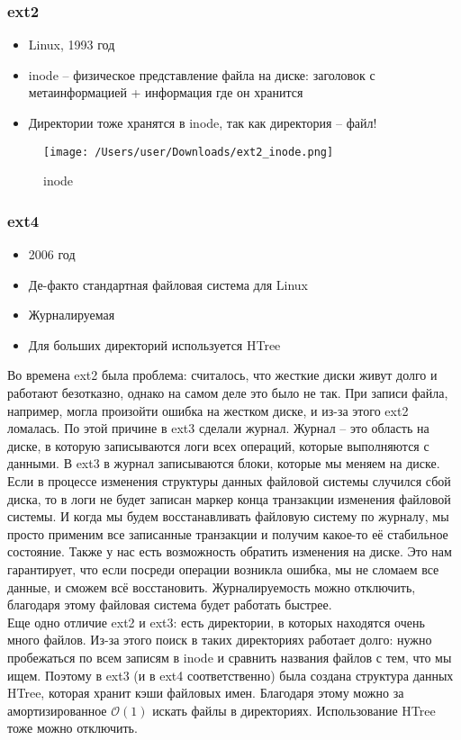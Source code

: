   \subsubsection{ext2}
    \begin{itemize}
      \item Linux, 1993 год
      \item inode -- физическое представление файла на диске: заголовок с метаинформацией + информация где он хранится
      \item Директории тоже хранятся в inode, так как директория -- файл!
    \end{itemize}

\begin{figure}[h!]
  \texttt{[image: /Users/user/Downloads/ext2\_inode.png]}
  \caption{inode}
  \label{fig:inode}
\end{figure}  
  
  \subsubsection{ext4}
    \begin{itemize}
      \item 2006 год
      \item Де-факто стандартная файловая система для Linux
      \item Журналируемая
      \item Для больших директорий используется HTree
    \end{itemize}
  
    Во времена ext2 была проблема: считалось, что жесткие диски живут долго и работают безотказно, однако на самом деле это было не так. При записи файла, например, могла произойти ошибка на жестком диске, и из-за этого ext2 ломалась. По этой причине в ext3 сделали журнал. Журнал -- это область на диске, в которую записываются логи всех операций, которые выполняются с данными. В ext3 в журнал записываются блоки, которые мы меняем на диске. Если в процессе изменения структуры данных файловой системы случился сбой диска, то в логи не будет записан маркер конца транзакции изменения файловой системы. И когда мы будем восстанавливать файловую систему по журналу, мы просто применим все записанные транзакции и получим какое-то её стабильное состояние. Также у нас есть возможность обратить изменения на диске. Это нам гарантирует, что если посреди операции возникла ошибка, мы не сломаем все данные, и сможем всё восстановить. Журналируемость можно отключить, благодаря этому файловая система будет работать быстрее. \\
    Еще одно отличие ext2 и ext3: есть директории, в которых находятся очень много файлов. Из-за этого поиск в таких директориях работает долго: нужно пробежаться по всем записям в inode и сравнить названия файлов с тем, что мы ищем. Поэтому в ext3 (и в ext4 соответственно) была создана структура данных HTree, которая хранит кэши файловых имен. Благодаря этому можно за амортизированное $\mathcal{O}(1)$ искать файлы в директориях. Использование HTree тоже можно отключить.
    
